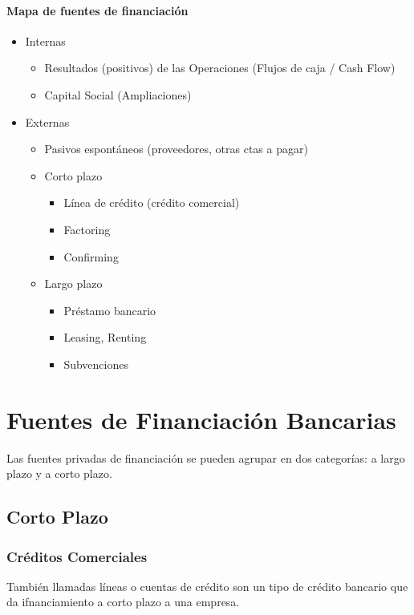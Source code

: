 \paragraph{Mapa de fuentes de financiación}
\begin{itemize}
    \item Internas
    \begin{itemize}
        \item Resultados (positivos) de las Operaciones (Flujos de caja / Cash Flow)
        \item Capital Social (Ampliaciones)
    \end{itemize}
    \item Externas
    \begin{itemize}
        \item Pasivos espontáneos (proveedores, otras ctas a pagar)
        \item Corto plazo
        \begin{itemize}
            \item Línea de crédito (crédito comercial)
            \item Factoring
            \item Confirming
        \end{itemize}
        \item Largo plazo
        \begin{itemize}
            \item Préstamo bancario
            \item Leasing, Renting
            \item Subvenciones
        \end{itemize}
    \end{itemize}
\end{itemize}

\section{Fuentes de Financiación Bancarias}
Las fuentes privadas de financiación se pueden agrupar en dos categorías: a largo plazo y a corto plazo.

\subsection{Corto Plazo}
\subsubsection{Créditos Comerciales}
También llamadas líneas o cuentas de crédito son un tipo de crédito bancario que da ifnanciamiento a corto plazo a una empresa.

